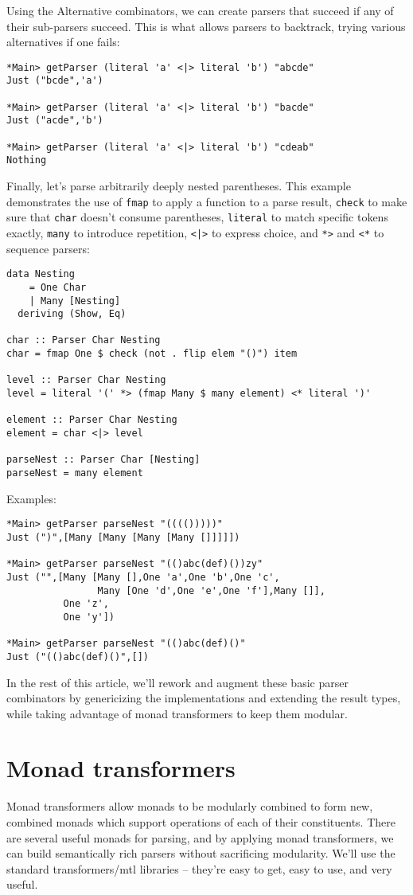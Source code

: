 \documentclass{tmr}
\begin{document}
Using the Alternative combinators, we can create parsers that succeed if any of
their sub-parsers succeed.  This is what allows parsers to backtrack, trying
various alternatives if one fails:
\begin{verbatim}
*Main> getParser (literal 'a' <|> literal 'b') "abcde"
Just ("bcde",'a')

*Main> getParser (literal 'a' <|> literal 'b') "bacde"
Just ("acde",'b')

*Main> getParser (literal 'a' <|> literal 'b') "cdeab"
Nothing
\end{verbatim}
Finally, let's parse arbitrarily deeply nested parentheses.  This example 
demonstrates the use of \verb+fmap+ to apply a function to a parse result, 
\verb+check+ to make sure that \verb+char+ doesn't consume parentheses,
\verb+literal+ to match specific tokens exactly, \verb+many+ to introduce
repetition, \verb+<|>+ to express choice, and \verb+*>+ 
and \verb+<*+ to sequence parsers:
\begin{verbatim}
data Nesting
    = One Char
    | Many [Nesting]
  deriving (Show, Eq)
  
char :: Parser Char Nesting
char = fmap One $ check (not . flip elem "()") item

level :: Parser Char Nesting
level = literal '(' *> (fmap Many $ many element) <* literal ')'

element :: Parser Char Nesting
element = char <|> level

parseNest :: Parser Char [Nesting]
parseNest = many element
\end{verbatim}
Examples:
\begin{verbatim}
*Main> getParser parseNest "(((()))))"
Just (")",[Many [Many [Many [Many []]]]])

*Main> getParser parseNest "(()abc(def)())zy"
Just ("",[Many [Many [],One 'a',One 'b',One 'c',
                Many [One 'd',One 'e',One 'f'],Many []],
          One 'z',
          One 'y'])

*Main> getParser parseNest "(()abc(def)()"
Just ("(()abc(def)()",[])
\end{verbatim}
In the rest of this article, we'll rework and augment these basic parser 
combinators by genericizing the implementations and extending the result types,
while taking advantage of monad transformers to keep them modular.




\section{Monad transformers}
Monad transformers \cite{liang} allow monads to be modularly combined to form 
new, combined monads which support operations of each of their constituents.  
There are several useful monads for parsing, and by applying monad transformers, 
we can build semantically rich parsers without sacrificing modularity.
We'll use the standard transformers/mtl \cite{mtl} libraries -- 
they're easy to get, easy to use, and very useful.
\end{document}
